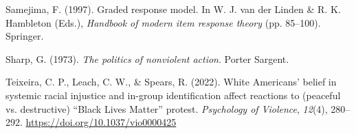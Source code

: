 \documentclass[12pt, letterpaper]{article}
\newenvironment{CSLReferences}[2]{}{}
\begin{document}
\begin{CSLReferences}{1}{0}
\leavevmode{}%
Samejima, F. (1997). Graded response model. In W. J. van der Linden \&
R. K. Hambleton (Eds.), \emph{Handbook of modern item response theory}
(pp. 85--100). Springer.

\leavevmode{}%
Sharp, G. (1973). \emph{The politics of nonviolent action}. Porter
Sargent.

\leavevmode{}%
Teixeira, C. P., Leach, C. W., \& Spears, R. (2022). White {Americans}'
belief in systemic racial injustice and in-group identification affect
reactions to ({peaceful} vs. {destructive}) {``{Black Lives Matter}''}
protest. \emph{Psychology of Violence}, \emph{12}(4), 280--292.
\url{https://doi.org/10.1037/vio0000425}

\end{CSLReferences}

\endgroup

\newpage
\end{document}
